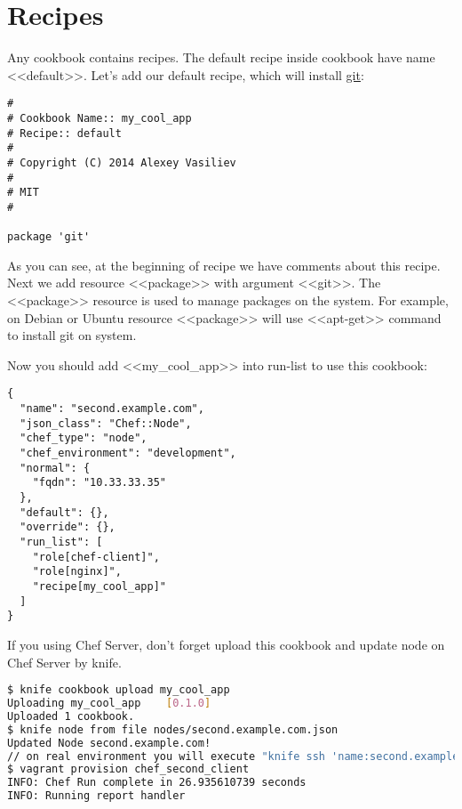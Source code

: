 \section{Recipes}
\label{sec:cookbook-recipes}

Any cookbook contains recipes. The default recipe inside cookbook have name <<default>>. Let's add our default recipe, which will install \href{http://git-scm.com/}{git}:

\begin{lstlisting}[label=lst:cookbook-recipes1,title=my-server-cloud/site-cookbooks/my\_cool\_app/recipes/default.rb]
#
# Cookbook Name:: my_cool_app
# Recipe:: default
#
# Copyright (C) 2014 Alexey Vasiliev
#
# MIT
#

package 'git'
\end{lstlisting}

As you can see, at the beginning of recipe we have comments about this recipe. Next we add resource <<package>> with argument <<git>>. The <<package>> resource is used to manage packages on the system. For example, on Debian or Ubuntu resource <<package>> will use <<apt-get>> command to install git on system.

Now you should add <<my\_cool\_app>> into run-list to use this cookbook:

\begin{lstlisting}[label=lst:cookbook-recipes2,title=my-server-cloud/nodes/second.example.com.json]
{
  "name": "second.example.com",
  "json_class": "Chef::Node",
  "chef_type": "node",
  "chef_environment": "development",
  "normal": {
    "fqdn": "10.33.33.35"
  },
  "default": {},
  "override": {},
  "run_list": [
    "role[chef-client]",
    "role[nginx]",
    "recipe[my_cool_app]"
  ]
}
\end{lstlisting}

If you using Chef Server, don't forget upload this cookbook and update node on Chef Server by knife.

\begin{lstlisting}[language=Bash,label=lst:cookbook-recipes3]
$ knife cookbook upload my_cool_app
Uploading my_cool_app    [0.1.0]
Uploaded 1 cookbook.
$ knife node from file nodes/second.example.com.json
Updated Node second.example.com!
// on real environment you will execute "knife ssh 'name:second.example.com' 'sudo chef-client' -i ../keys/production.pem -x ubuntu"
$ vagrant provision chef_second_client
INFO: Chef Run complete in 26.935610739 seconds
INFO: Running report handler
\end{lstlisting}

